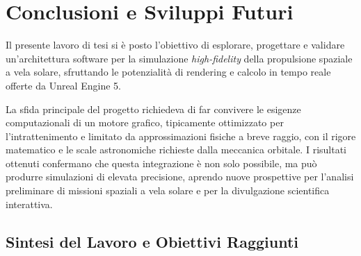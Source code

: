 \chapter{Conclusioni e Sviluppi Futuri}
\label{chap:conclusioni}

Il presente lavoro di tesi si è posto l'obiettivo di esplorare, progettare e validare un'architettura software per la simulazione \textit{high-fidelity} della propulsione spaziale a vela solare, sfruttando le potenzialità di rendering e calcolo in tempo reale offerte da Unreal Engine 5. 

La sfida principale del progetto richiedeva di far convivere le esigenze computazionali di un motore grafico, tipicamente ottimizzato per l'intrattenimento e limitato da approssimazioni fisiche a breve raggio, con il rigore matematico e le scale astronomiche richieste dalla meccanica orbitale. I risultati ottenuti confermano che questa integrazione è non solo possibile, ma può produrre simulazioni di elevata precisione, aprendo nuove prospettive per l'analisi preliminare di missioni spaziali a vela solare e per la divulgazione scientifica interattiva.


\section{Sintesi del Lavoro e Obiettivi Raggiunti}

